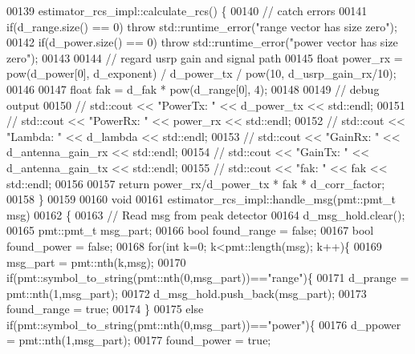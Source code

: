\begin{DoxyCode}
00139     estimator_rcs_impl::calculate_rcs() \{
00140       \textcolor{comment}{// catch errors}
00141             \textcolor{keywordflow}{if}(d_range.size() == 0) \textcolor{keywordflow}{throw} std::runtime\_error(\textcolor{stringliteral}{"range vector has size zero"});
00142             \textcolor{keywordflow}{if}(d_power.size() == 0) \textcolor{keywordflow}{throw} std::runtime\_error(\textcolor{stringliteral}{"power vector has size zero"});
00143 
00144       \textcolor{comment}{// regard usrp gain and signal path}
00145             \textcolor{keywordtype}{float} power\_rx = pow(d_power[0], d_exponent) / d_power_tx / pow(10, 
      d_usrp_gain_rx/10);
00146             
00147             \textcolor{keywordtype}{float} fak = d_fak * pow(d_range[0], 4);
00148 
00149       \textcolor{comment}{// debug output}
00150       \textcolor{comment}{// std::cout << "PowerTx: " << d\_power\_tx << std::endl;}
00151       \textcolor{comment}{// std::cout << "PowerRx: " << power\_rx << std::endl;}
00152       \textcolor{comment}{// std::cout << "Lambda: " << d\_lambda << std::endl;}
00153       \textcolor{comment}{// std::cout << "GainRx: " << d\_antenna\_gain\_rx << std::endl;}
00154       \textcolor{comment}{// std::cout << "GainTx: " << d\_antenna\_gain\_tx << std::endl;}
00155       \textcolor{comment}{// std::cout << "fak: " << fak << std::endl;}
00156 
00157             \textcolor{keywordflow}{return} power\_rx/d_power_tx * fak * d_corr_factor;
00158     \}
00159 
00160     \textcolor{keywordtype}{void}
00161     estimator_rcs_impl::handle_msg(pmt::pmt\_t msg)
00162     \{
00163         \textcolor{comment}{// Read msg from peak detector}
00164         d_msg_hold.clear();
00165         pmt::pmt\_t msg\_part;
00166         \textcolor{keywordtype}{bool} found\_range = \textcolor{keyword}{false};
00167         \textcolor{keywordtype}{bool} found\_power = \textcolor{keyword}{false};
00168         \textcolor{keywordflow}{for}(\textcolor{keywordtype}{int} k=0; k<pmt::length(msg); k++)\{
00169           msg\_part = pmt::nth(k,msg);
00170           \textcolor{keywordflow}{if}(pmt::symbol\_to\_string(pmt::nth(0,msg\_part))==\textcolor{stringliteral}{"range"})\{
00171             d_prange = pmt::nth(1,msg\_part);
00172             d_msg_hold.push\_back(msg\_part);
00173             found\_range = \textcolor{keyword}{true};
00174           \}
00175           \textcolor{keywordflow}{else} \textcolor{keywordflow}{if}(pmt::symbol\_to\_string(pmt::nth(0,msg\_part))==\textcolor{stringliteral}{"power"})\{
00176             d_ppower = pmt::nth(1,msg\_part);
00177             found\_power = \textcolor{keyword}{true};

\end{DoxyCode}
